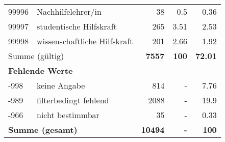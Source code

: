 \begin{longtable}{lXrrr}
        99996 & \multicolumn{1}{X}{Nachhilfelehrer/in} & %
          \num{38} &
          \num[round-mode=places,round-precision=2]{0.5} &
          \num[round-mode=places,round-precision=2]{0.36} \\

        99997 & \multicolumn{1}{X}{studentische Hilfskraft} & %
          \num{265} &
          \num[round-mode=places,round-precision=2]{3.51} &
          \num[round-mode=places,round-precision=2]{2.53} \\

        99998 & \multicolumn{1}{X}{wissenschaftliche Hilfskraft} & %
          \num{201} &
          \num[round-mode=places,round-precision=2]{2.66} &
          \num[round-mode=places,round-precision=2]{1.92} \\

     \midrule
     \multicolumn{2}{l}{Summe (gültig)} &
       \textbf{\num{7557}} &
     \textbf{\num{100}} &
       \textbf{\num[round-mode=places,round-precision=2]{72.01}} \\
     \multicolumn{5}{l}{\textbf{Fehlende Werte}}\\
       -998 &
       keine Angabe &
         \num{814} &
        - &
         \num[round-mode=places,round-precision=2]{7.76} \\
       -989 &
       filterbedingt fehlend &
         \num{2088} &
        - &
         \num[round-mode=places,round-precision=2]{19.9} \\
       -966 &
       nicht bestimmbar &
         \num{35} &
        - &
         \num[round-mode=places,round-precision=2]{0.33} \\
     \midrule
     \multicolumn{2}{l}{\textbf{Summe (gesamt)}} &
          \textbf{\num{10494}} &
        \textbf{-} &
        \textbf{\num{100}} \\
     \bottomrule
     \end{longtable}
     
